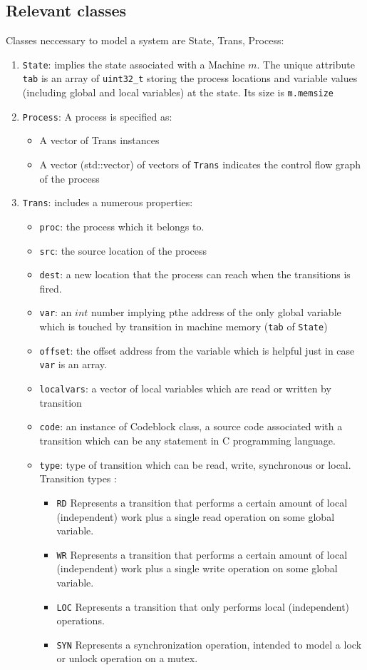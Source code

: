 \documentclass{llncs}
\begin{document}
\subsection{Relevant classes}
Classes neccessary to model a system are State, Trans, Process:
\begin{enumerate}
\item
	\verb!State!: implies the state associated with a Machine $m$. The unique attribute \verb!tab! is an array of \verb!uint32_t! storing the process locations and variable values (including global and local variables) at the state. Its size is \verb!m.memsize!
\item
	\verb!Process!: A process is specified as:
	\begin{itemize}
	\item
		A vector of Trans instances
	\item
		A vector (std::vector) of vectors of \verb!Trans! indicates the control flow graph of the process
	\end{itemize}	 
\item
	\verb!Trans!: includes a numerous properties:
	\begin{itemize}
	\item
		\verb!proc!: the process which it belongs to.
	\item
		\verb!src!: the source location of the process
	\item
		\verb!dest!: a new location that the process can reach when the transitions is fired.
	\item
		\verb!var!: an $int$ number implying pthe address  of the only global variable which is touched
		 by transition in machine memory (\verb!tab! of \verb!State!)
	\item
		\verb!offset!: the offset address from the variable which is helpful just in case \verb!var! is an array.
	\item
		\verb!localvars!: a vector of local variables which are read or written by transition
	\item
		\verb!code!: an instance of Codeblock class, a source code associated with a transition which can be any statement in C
		 programming language.
	\item
		\verb!type!: type of transition which can be read, write, synchronous or local. 
		Transition types :
		\begin{itemize}
		\item
			\verb!RD! Represents a transition that performs a certain amount of local (independent) work plus a single read
			 operation on some global variable.
		\item
			\verb!WR! Represents a transition that performs a certain amount of local (independent) work plus a single write
			 operation on some global variable.
		\item
			\verb!LOC! Represents a transition that only performs local (independent) operations.
		\item
			\verb!SYN! Represents a synchronization operation, intended to model a lock or unlock operation on a mutex.
		\end{itemize}
		

\end{itemize}
\end{enumerate}
\end{document}
